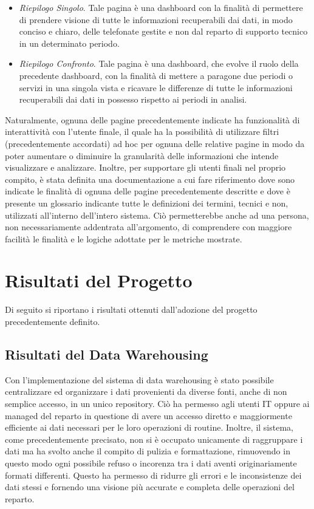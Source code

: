 \begin{enumerate}
\begin{itemize}
        \item \textit{Riepilogo Singolo}. Tale pagina è una dashboard con la finalità di permettere di prendere visione di tutte le informazioni recuperabili dai dati, in modo conciso e chiaro, delle telefonate gestite e non dal reparto di supporto tecnico in un determinato periodo.
        \item \textit{Riepilogo Confronto}. Tale pagina è una dashboard, che evolve il ruolo della precedente dashboard, con la finalità di mettere a paragone due periodi o servizi in una singola vista e ricavare le differenze di tutte le informazioni recuperabili dai dati in possesso rispetto ai periodi in analisi.
    \end{itemize}
\end{enumerate}

Naturalmente, ognuna delle pagine precedentemente indicate ha funzionalità di interattività con l'utente finale, il quale ha la possibilità di utilizzare filtri (precedentemente accordati) ad hoc per ognuna delle relative pagine in modo da poter aumentare o diminuire la granularità delle informazioni che intende visualizzare e analizzare.
Inoltre, per supportare gli utenti finali nel proprio compito, è stata definita una documentazione a cui fare riferimento dove sono indicate le finalità di ognuna delle pagine precedentemente descritte e dove è presente un glossario indicante tutte le definizioni dei termini, tecnici e non, utilizzati all'interno dell'intero sistema. Ciò permetterebbe anche ad una persona, non necessariamente addentrata all'argomento, di comprendere con maggiore facilità le finalità e le logiche adottate per le metriche mostrate.

\section{Risultati del Progetto}

Di seguito si riportano i risultati ottenuti dall'adozione del progetto precedentemente definito.

\subsection{Risultati del Data Warehousing}
Con l'implementazione del sistema di data warehousing è stato possibile centralizzare ed organizzare i dati provenienti da diverse fonti, anche di non semplice accesso, in un unico repository. Ciò ha permesso agli utenti IT oppure ai managed del reparto in questione di avere un accesso diretto e maggiormente efficiente ai dati necessari per le loro operazioni di routine. Inoltre, il sistema, come precedentemente precisato, non si è occupato unicamente di raggruppare i dati ma ha svolto anche il compito di pulizia e formattazione, rimuovendo in questo modo ogni possibile refuso o incorenza tra i dati aventi originariamente formati differenti. Questo ha permesso di ridurre gli errori e le inconsistenze dei dati stessi e fornendo una visione più accurate e completa delle operazioni del reparto.

